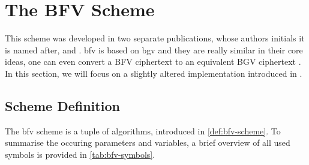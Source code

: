 \pagebreak
\section{The BFV Scheme}
\label{sec:bfv}
This scheme was developed in two separate publications, whose authors initials it is named after, \cite{2012-brakerski} and \cite{2012-fv-original}.
\gls{bfv} is based on \gls{bgv} and they are really similar in their core ideas, one can even convert a BFV ciphertext to an equivalent BGV ciphertext \parencite{2021-he-revisiting}.
In this section, we will focus on a slightly altered implementation introduced in \cite{2014-fv-comparison}.

\subsection{Scheme Definition}
The \gls{bfv} scheme is a tuple of algorithms, introduced in \cref{def:bfv-scheme}.
To summarise the occuring parameters and variables, a brief overview of all used symbols is provided in \cref{tab:bfv-symbols}.

